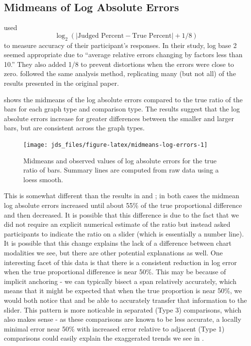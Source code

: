 \documentclass[letterpaper,inpress,dvipsnames]{jdsart}
\begin{document}
\hypertarget{midmeans-of-log-absolute-errors}{%
\subsection{Midmeans of Log Absolute Errors}\label{midmeans-of-log-absolute-errors}}

\citeauthor{clevelandGraphical1984} used
\[\log_2(|\text{Judged Percent} - \text{True Percent}|+1/8)\]
to measure accuracy of their participant's responses.
In their study, log base 2 seemed appropriate due to ``average relative errors changing by factors less than 10.''
They also added 1/8 to prevent distortions when the errors were close to zero.
\citet{heerCrowdsourcingGraphicalPerception2010b} followed the same analysis method, replicating many (but not all) of the results presented in the original paper.

 shows the midmeans of the log absolute errors compared to the true ratio of the bars for each graph type and comparison type.
The results suggest that the log absolute errors increase for greater differences between the smaller and larger bars, but are consistent across the graph types.

\begin{figure}
\texttt{[image: jds\_files/figure-latex/midmeans-log-errors-1]} \caption{Midmeans and observed values of log absolute errors for the true ratio of bars. Summary lines are computed from raw data using a loess smooth.}\label{fig:midmeans-log-errors}
\end{figure}

This is somewhat different than the results in \citet{clevelandGraphical1984} and \citet{heerCrowdsourcingGraphicalPerception2010b}; in both cases the midmean log absolute errors increased until about 55\% of the true proportional difference and then decreased.
It is possible that this difference is due to the fact that we did not require an explicit numerical estimate of the ratio but instead asked participants to indicate the ratio on a slider (which is essentially a number line).
It is possible that this change explains the lack of a difference between chart modalities we see, but there are other potential explanations as well.
One interesting facet of this data is that there is a consistent reduction in log error when the true proportional difference is near 50\%.
This may be because of implicit anchoring - we can typically bisect a span relatively accurately, which means that it might be expected that when the true proportion is near 50\%, we would both notice that and be able to accurately transfer that information to the slider.
This pattern is more noticable in separated (Type 3) comparisons, which also makes sense - as these comparisons are known to be less accurate, a locally minimal error near 50\% with increased error relative to adjacent (Type 1) comparisons could easily explain the exaggerated trends we see in .
\end{document}
